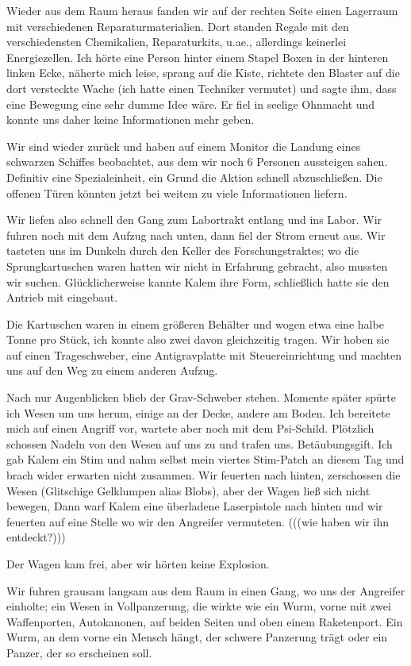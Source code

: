 \documentclass[11pt]{article}
\begin{document}
Wieder aus dem Raum heraus fanden wir auf der rechten Seite einen
Lagerraum mit verschiedenen Reparaturmaterialien. Dort standen Regale
mit den verschiedensten Chemikalien, Reparaturkits, u.ae., allerdings
keinerlei Energiezellen. Ich hörte eine Person hinter einem Stapel Boxen
in der hinteren linken Ecke, näherte mich leise, sprang auf die Kiste,
richtete den Blaster auf die dort versteckte Wache (ich hatte einen
Techniker vermutet) und sagte ihm, dass eine Bewegung eine sehr dumme
Idee wäre. Er fiel in seelige Ohnmacht und konnte uns daher keine
Informationen mehr geben.

Wir sind wieder zurück und haben auf einem Monitor die Landung eines
schwarzen Schiffes beobachtet, aus dem wir noch 6 Personen aussteigen
sahen. Definitiv eine Spezialeinheit, ein Grund die Aktion schnell
abzuschließen. Die offenen Türen könnten jetzt bei weitem zu viele
Informationen liefern.

Wir liefen also schnell den Gang zum Labortrakt entlang und ins Labor.
Wir fuhren noch mit dem Aufzug nach unten, dann fiel der Strom erneut
aus. Wir tasteten uns im Dunkeln durch den Keller des Forschungstraktes;
wo die Sprungkartuschen waren hatten wir nicht in Erfahrung gebracht,
also mussten wir suchen. Glücklicherweise kannte Kalem ihre Form,
schließlich hatte sie den Antrieb mit eingebaut.

Die Kartuschen waren in einem größeren Behälter und wogen etwa eine
halbe Tonne pro Stück, ich konnte also zwei davon gleichzeitig tragen.
Wir hoben sie auf einen Trageschweber, eine Antigravplatte mit
Steuereinrichtung und machten uns auf den Weg zu einem anderen Aufzug.

Nach nur Augenblicken blieb der Grav-Schweber stehen. Momente später
spürte ich Wesen um uns herum, einige an der Decke, andere am Boden. Ich
bereitete mich auf einen Angriff vor, wartete aber noch mit dem
Psi-Schild. Plötzlich schossen Nadeln von den Wesen auf uns zu und
trafen uns. Betäubungsgift. Ich gab Kalem ein Stim und nahm selbst mein
viertes Stim-Patch an diesem Tag und brach wider erwarten nicht
zusammen. Wir feuerten nach hinten, zerschossen die Wesen (Glitschige
Gelklumpen alias Blobs), aber der Wagen ließ sich nicht bewegen, Dann
warf Kalem eine überladene Laserpistole nach hinten und wir feuerten auf
eine Stelle wo wir den Angreifer vermuteten. (((wie haben wir ihn
entdeckt?)))

Der Wagen kam frei, aber wir hörten keine Explosion.

Wir fuhren grausam langsam aus dem Raum in einen Gang, wo uns der
Angreifer einholte; ein Wesen in Vollpanzerung, die wirkte wie ein Wurm,
vorne mit zwei Waffenporten, Autokanonen, auf beiden Seiten und oben
einem Raketenport. Ein Wurm, an dem vorne ein Mensch hängt, der schwere
Panzerung trägt oder ein Panzer, der so erscheinen soll.
\end{document}
